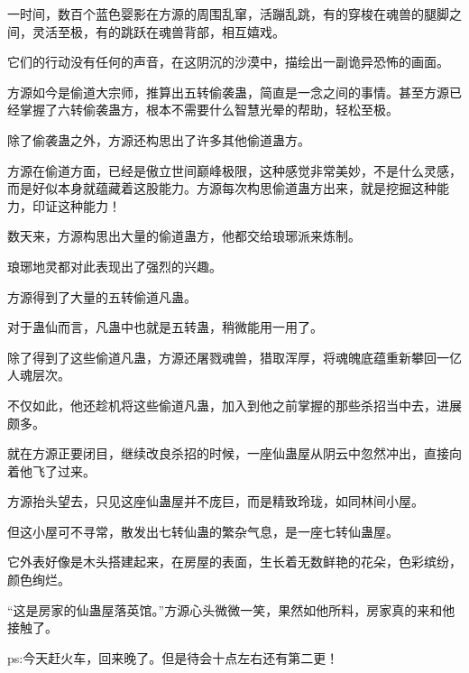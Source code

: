 \begin{this_body}
一时间，数百个蓝色婴影在方源的周围乱窜，活蹦乱跳，有的穿梭在魂兽的腿脚之间，灵活至极，有的跳跃在魂兽背部，相互嬉戏。

它们的行动没有任何的声音，在这阴沉的沙漠中，描绘出一副诡异恐怖的画面。

方源如今是偷道大宗师，推算出五转偷袭蛊，简直是一念之间的事情。甚至方源已经掌握了六转偷袭蛊方，根本不需要什么智慧光晕的帮助，轻松至极。

除了偷袭蛊之外，方源还构思出了许多其他偷道蛊方。

方源在偷道方面，已经是傲立世间巅峰极限，这种感觉非常美妙，不是什么灵感，而是好似本身就蕴藏着这股能力。方源每次构思偷道蛊方出来，就是挖掘这种能力，印证这种能力！

数天来，方源构思出大量的偷道蛊方，他都交给琅琊派来炼制。

琅琊地灵都对此表现出了强烈的兴趣。

方源得到了大量的五转偷道凡蛊。

对于蛊仙而言，凡蛊中也就是五转蛊，稍微能用一用了。

除了得到了这些偷道凡蛊，方源还屠戮魂兽，猎取浑厚，将魂魄底蕴重新攀回一亿人魂层次。

不仅如此，他还趁机将这些偷道凡蛊，加入到他之前掌握的那些杀招当中去，进展颇多。

就在方源正要闭目，继续改良杀招的时候，一座仙蛊屋从阴云中忽然冲出，直接向着他飞了过来。

方源抬头望去，只见这座仙蛊屋并不庞巨，而是精致玲珑，如同林间小屋。

但这小屋可不寻常，散发出七转仙蛊的繁杂气息，是一座七转仙蛊屋。

它外表好像是木头搭建起来，在房屋的表面，生长着无数鲜艳的花朵，色彩缤纷，颜色绚烂。

“这是房家的仙蛊屋落英馆。”方源心头微微一笑，果然如他所料，房家真的来和他接触了。

ps:今天赶火车，回来晚了。但是待会十点左右还有第二更！

\end{this_body}

